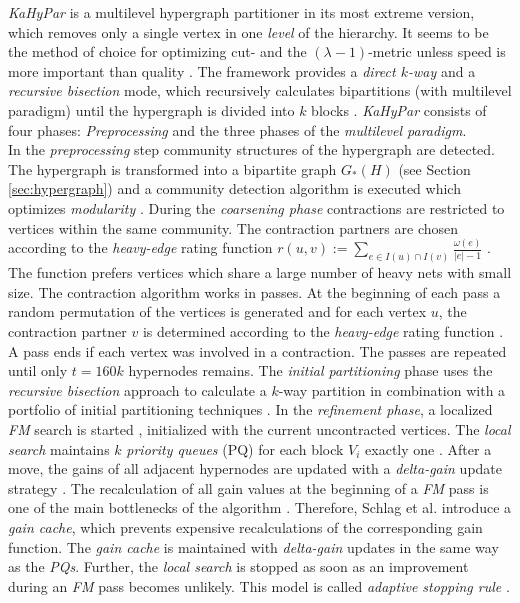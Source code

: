\emph{KaHyPar} is a multilevel hypergraph partitioner in its most extreme version, which
removes only a single vertex in one \emph{level} of the hierarchy. It seems to be the method
of choice for optimizing cut- and the $(\lambda - 1)$-metric unless speed is more important than
quality \cite{heuer2017improving}. The framework provides a \emph{direct $k$-way} \cite{akhremtsev2017engineering} 
and a \emph{recursive bisection} mode, which recursively calculates bipartitions 
(with multilevel paradigm) until the hypergraph is divided into $k$ blocks 
\cite{schlag2016k}. \emph{KaHyPar} consists of four phases: \emph{Preprocessing}
and the three phases of the \emph{multilevel paradigm}. \\
In the \emph{preprocessing} step community structures of the hypergraph are detected. The
hypergraph is transformed into a bipartite graph $G_*(H)$ (see Section \ref{sec:hypergraph}) and
a community detection algorithm is executed which optimizes \emph{modularity} \cite{fortunato2010community,
heuer2017improving}. During the \emph{coarsening phase} contractions are restricted to vertices within the same 
community. The contraction partners are chosen according to the \emph{heavy-edge} rating function
$r(u,v) := \sum_{e \in I(u) \cap I(v)} \frac{\omega(e)}{|e|-1}$ \cite{karypis1999multilevel}. The
function prefers vertices which share a large number of heavy nets with small size. The contraction
algorithm works in passes. At the beginning of each pass a random permutation of the vertices 
is generated and for each vertex $u$, the contraction partner $v$ is determined according
to the \emph{heavy-edge} rating function \cite{schlag2016k}. A pass ends if each vertex was involved
in a contraction. The passes are repeated until only
$t = 160k$ hypernodes remains.
The \emph{initial partitioning} phase uses the \emph{recursive bisection} approach to calculate
a $k$-way partition in combination with a portfolio of initial partitioning techniques 
\cite{heuer2015engineering}. In the \emph{refinement phase}, a localized \emph{FM} search is started \cite{fiduccia1988linear},
initialized with the current uncontracted vertices. The \emph{local search} maintains $k$ \emph{priority
queues} (PQ) for each block $V_i$ exactly one \cite{akhremtsev2017engineering}. After a move,
the gains of all adjacent hypernodes are updated with a \emph{delta-gain} update strategy \cite{papa2007hypergraph}.
The recalculation of all gain values at the beginning of a \emph{FM} pass is one of the main bottlenecks
of the algorithm \cite{papa2007hypergraph}. Therefore, Schlag et al. \cite{akhremtsev2017engineering,
schlag2016k} introduce a \emph{gain cache}, which prevents
expensive recalculations of the corresponding gain function. The \emph{gain cache} is maintained
with \emph{delta-gain} updates in the same way as the \emph{PQs}. Further, the \emph{local search}
is stopped as soon as an improvement during an \emph{FM} pass becomes unlikely. This model is
called \emph{adaptive stopping rule} \cite{akhremtsev2017engineering}.
